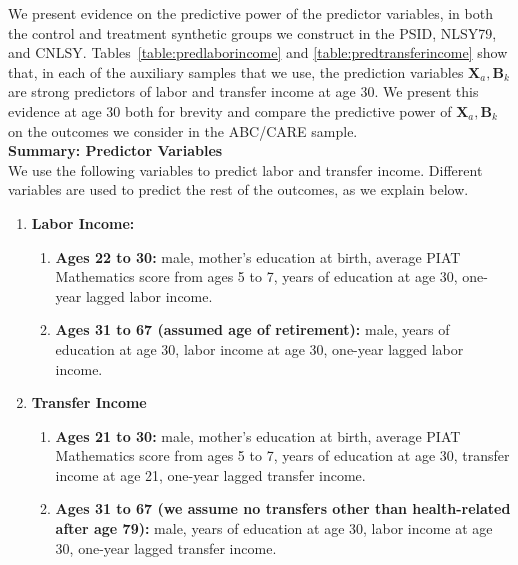 \noindent We present evidence on the predictive power of the predictor variables, in both the control and treatment synthetic groups we construct in the PSID, NLSY79, and CNLSY. Tables~\ref{table:predlaborincome} and \ref{table:predtransferincome} show that, in each of the auxiliary samples that we use, the prediction variables $\bm{X}_{a}, \bm{B}_k$ are strong predictors of labor and transfer  income at age 30. We present this evidence at age 30 both for brevity and compare the predictive power of $\bm{X}_{a},\bm{B}_k$ on the outcomes we consider in the ABC/CARE sample.\\

\noindent \textbf{Summary: Predictor Variables}\\
\noindent We use the following variables to predict labor and transfer income. Different variables are used to predict the rest of the outcomes, as we explain below.
\begin{enumerate}
\item \textbf{Labor Income:}
\begin{enumerate}
\item \textbf{Ages 22 to 30:} male, mother's education at birth, average PIAT Mathematics score from ages 5 to 7, years of education at age 30, one-year lagged labor income.
\item \textbf{Ages 31 to 67 (assumed age of retirement):} male, years of education at age 30, labor income at age 30, one-year lagged labor income.
\end{enumerate}
\item \textbf{Transfer Income}
\begin{enumerate}
\item \textbf{Ages 21 to 30:} male, mother's education at birth, average PIAT Mathematics score from ages 5 to 7, years of education at age 30, transfer income at age 21, one-year lagged transfer income.
\item \textbf{Ages 31 to 67 (we assume no transfers other than health-related after age 79):} male, years of education at age 30, labor income at age 30, one-year lagged transfer income.
\end{enumerate}
\end{enumerate}

